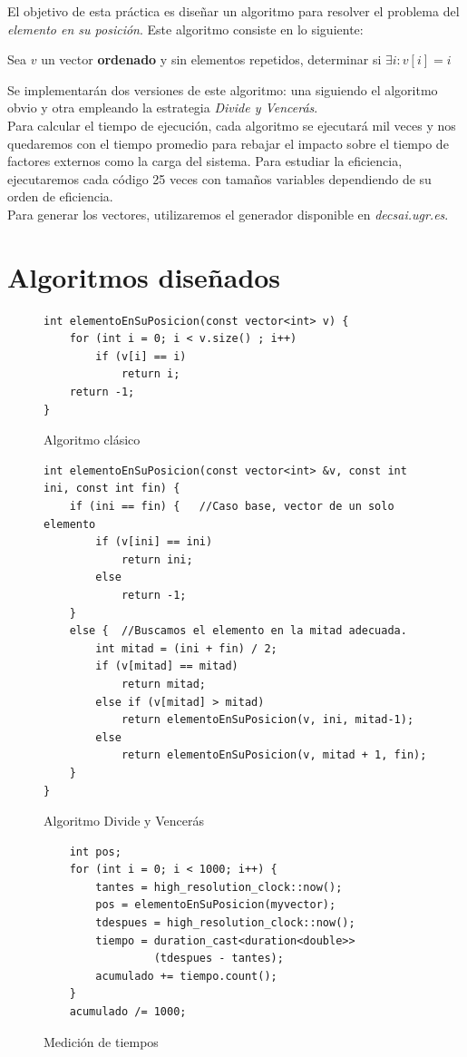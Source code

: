 \documentclass[12pt,spanish]{article}
\begin{document}
El objetivo de esta práctica es diseñar un algoritmo para resolver el problema del \textit{elemento en su posición}. Este algoritmo consiste en lo siguiente:
\begin{center}
Sea $v$ un vector \textbf{ordenado} y sin elementos repetidos, determinar si $\exists i : v[i]=i $
\end{center}
Se implementarán dos versiones de este algoritmo: una siguiendo el algoritmo obvio y otra empleando la estrategia \emph{Divide y Vencerás}. \\

Para calcular el tiempo de ejecución, cada algoritmo se ejecutará mil veces y nos quedaremos con el tiempo promedio para rebajar el impacto sobre el tiempo de factores externos como la carga del sistema. Para estudiar la eficiencia, ejecutaremos cada código 25 veces con tamaños variables dependiendo de su orden de eficiencia. \\
Para generar los vectores, utilizaremos el generador disponible en \textit{decsai.ugr.es}.

\section{Algoritmos diseñados}

\begin{figure}[H]
\begin{verbatim}
int elementoEnSuPosicion(const vector<int> v) {
	for (int i = 0; i < v.size() ; i++)
		if (v[i] == i)
			return i;
	return -1;
}
\end{verbatim}
\caption{Algoritmo clásico}
\label{alg:clasico}
\end{figure}

\begin{figure}[H]
\begin{verbatim}
int elementoEnSuPosicion(const vector<int> &v, const int ini, const int fin) {
	if (ini == fin) {	//Caso base, vector de un solo elemento
		if (v[ini] == ini)
			return ini;
		else
			return -1;
	}
	else {	//Buscamos el elemento en la mitad adecuada.
		int mitad = (ini + fin) / 2;
		if (v[mitad] == mitad)
			return mitad;
		else if (v[mitad] > mitad)
			return elementoEnSuPosicion(v, ini, mitad-1);
		else
			return elementoEnSuPosicion(v, mitad + 1, fin);
	}
}	
\end{verbatim}
\caption{Algoritmo Divide y Vencerás}
\label{alg:dyv}
\end{figure}

\begin{figure}[H]
\begin{verbatim}
	int pos;
	for (int i = 0; i < 1000; i++) {
		tantes = high_resolution_clock::now();
		pos = elementoEnSuPosicion(myvector);
		tdespues = high_resolution_clock::now();
		tiempo = duration_cast<duration<double>>
		         (tdespues - tantes);
		acumulado += tiempo.count();
	}
	acumulado /= 1000;
\end{verbatim}
\caption{Medición de tiempos}
\end{figure}
\end{document}
